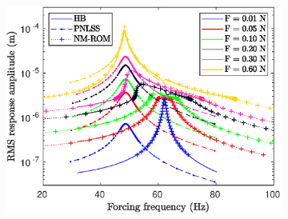 \documentclass[aspectratio=169]{beamer}
\begin{document}
\begin{frame}[allowframebreaks]
\begin{figure}[!h]
\begin{subfigure}{0.2\linewidth}
      \includegraphics[width=\linewidth]{../../benchmark4/extabs_fig/b4_fresp_comp_famp20_nx23}
    \end{subfigure}%
    

\end{figure}
\end{frame}
\end{document}
